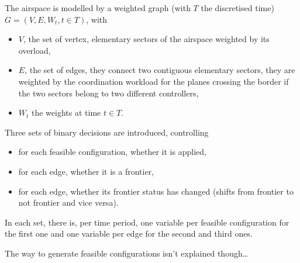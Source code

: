 \documentclass{article}
\begin{document}
The airspace is modelled by a weighted graph (with \(T\) the discretised time)
\(G = (V, E, W_t, t\in T)\), with
\begin{itemize}
  \item \(V\), the set of vertex, elementary sectors of the airspace weighted by
    its overload,
  \item \(E\), the set of edges, they connect two contiguous elementary sectors,
    they are weighted by the coordination workload for the planes crossing the
    border if the two sectors belong to two different controllers,
  \item \(W_t\) the weights at time \(t\in T\).
\end{itemize}


Three sets of binary decisions are introduced, controlling
\begin{itemize}
  \item for each feasible configuration, whether it is applied,
  \item for each edge, whether it is a frontier,
  \item for each edge, whether its frontier status has changed (shifts from
    frontier to not frontier and vice versa).
\end{itemize}
In each set, there is, per time period, one variable per feasible configuration
for the first one and one variable per edge for the second and third ones.

The way to generate feasible configurations isn't explained though\dots






\end{document}

